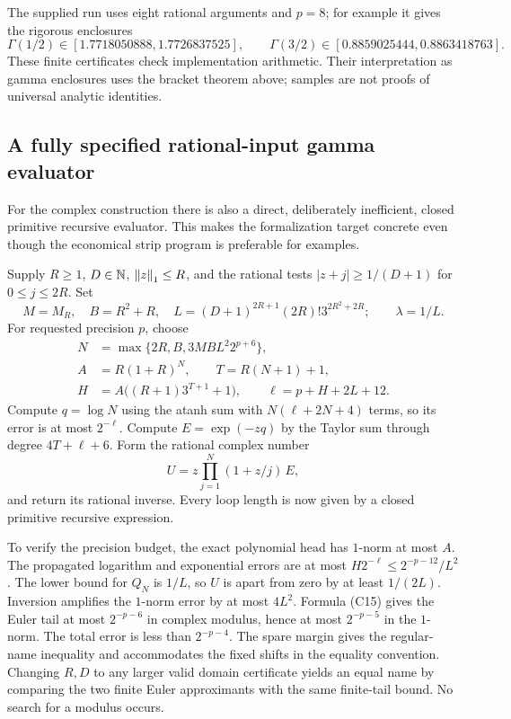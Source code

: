 The supplied run uses eight rational arguments and $p=8$; for example
it gives the rigorous enclosures
\[
 \Gamma(1/2)\in[1.7718050888,1.7726837525],\qquad
 \Gamma(3/2)\in[0.8859025444,0.8863418763].
\]
These finite certificates check implementation arithmetic. Their
interpretation as gamma enclosures uses the bracket theorem above;
samples are not proofs of universal analytic identities.

\subsection{A fully specified rational-input gamma evaluator}

For the complex construction there is also a direct, deliberately
inefficient, closed primitive recursive evaluator. This makes the
formalization target concrete even though the economical strip program
is preferable for examples.

Supply $R\ge1$, $D\in\mathbb N$, $\left\|z\right\|_1\le R$, and the rational tests
$|z+j|\ge1/(D+1)$ for $0\le j\le2R$. Set
\[
 M=M_R,\quad B=R^2+R,\quad
 L=(D+1)^{2R+1}(2R)!3^{2R^2+2R};
 \qquad\lambda=1/L.
\]
For requested precision $p$, choose
\begin{align*}
 N&=\max\{2R,B,3MBL^2 2^{p+6}\},\\
 A&=R(1+R)^N,\qquad T=R(N+1)+1,\\
 H&=A\bigl((R+1)3^{T+1}+1\bigr),\qquad
 \ell=p+H+2L+12.
\end{align*}
Compute $q=\log N$ using the atanh sum with
$N(\ell+2N+4)$ terms, so its error is at most $2^{-\ell}$.
Compute $E=\exp(-zq)$ by the Taylor sum through degree
$4T+\ell+6$. Form the rational complex number
\[
 U=z\prod_{j=1}^N(1+z/j)\,E,
\]
and return its rational inverse. Every loop length is now given by a
closed primitive recursive expression.

To verify the precision budget, the exact polynomial head has
$1$-norm at most $A$. The propagated logarithm and exponential errors
are at most $H2^{-\ell}\le2^{-p-12}/L^2$.
The lower bound for $Q_N$ is $1/L$, so $U$ is apart from zero by at
least $1/(2L)$. Inversion amplifies the $1$-norm error by at most
$4L^2$. Formula (C15) gives the Euler tail at most $2^{-p-6}$ in
complex modulus, hence at most $2^{-p-5}$ in the $1$-norm. The total
error is less than $2^{-p-4}$. The spare margin gives the regular-name
inequality and accommodates the fixed shifts in the equality convention.
Changing $R,D$ to any larger valid domain certificate yields an equal
name by comparing the two finite Euler approximants with the same
finite-tail bound. No search for a modulus occurs.

